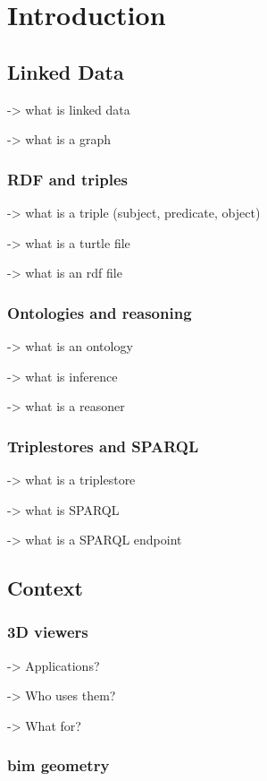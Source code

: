 \chapter{Introduction}
\section{Linked Data}
-> what is linked data

-> what is a graph

\subsection{RDF and triples}
-> what is a triple (subject, predicate, object)

-> what is a turtle file

-> what is an rdf file

\subsection{Ontologies and reasoning}
-> what is an ontology

-> what is inference

-> what is a reasoner

\subsection{Triplestores and SPARQL}
-> what is a triplestore

-> what is SPARQL

-> what is a SPARQL endpoint

\section{Context}
\subsection{3D viewers}
-> Applications?

-> Who uses them?

-> What for?

\subsection{\acs{bim} geometry} \label{subsec:bimGeometry}

